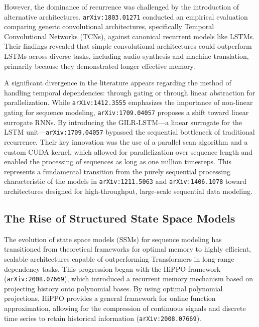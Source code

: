 \documentclass[11pt]{article}
\begin{document}
However, the dominance of recurrence was challenged by the introduction of alternative architectures. \texttt{arXiv:1803.01271} conducted an empirical evaluation comparing generic convolutional architectures, specifically Temporal Convolutional Networks (TCNs), against canonical recurrent models like LSTMs. Their findings revealed that simple convolutional architectures could outperform LSTMs across diverse tasks, including audio synthesis and machine translation, primarily because they demonstrated longer effective memory.

A significant divergence in the literature appears regarding the method of handling temporal dependencies: through gating or through linear abstraction for parallelization. While \texttt{arXiv:1412.3555} emphasizes the importance of non-linear gating for sequence modeling, \texttt{arXiv:1709.04057} proposes a shift toward linear surrogate RNNs. By introducing the GILR-LSTM—a linear surrogate for the LSTM unit—\texttt{arXiv:1709.04057} bypassed the sequential bottleneck of traditional recurrence. Their key innovation was the use of a parallel scan algorithm and a custom CUDA kernel, which allowed for parallelization over sequence length and enabled the processing of sequences as long as one million timesteps. This represents a fundamental transition from the purely sequential processing characteristic of the models in \texttt{arXiv:1211.5063} and \texttt{arXiv:1406.1078} toward architectures designed for high-throughput, large-scale sequential data modeling.

\subsection{The Rise of Structured State Space Models}

The evolution of state space models (SSMs) for sequence modeling has transitioned from theoretical frameworks for optimal memory to highly efficient, scalable architectures capable of outperforming Transformers in long-range dependency tasks. This progression began with the HiPPO framework (\texttt{arXiv:2008.07669}), which introduced a recurrent memory mechanism based on projecting history onto polynomial bases. By using optimal polynomial projections, HiPPO provides a general framework for online function approximation, allowing for the compression of continuous signals and discrete time series to retain historical information (\texttt{arXiv:2008.07669}).
\end{document}
